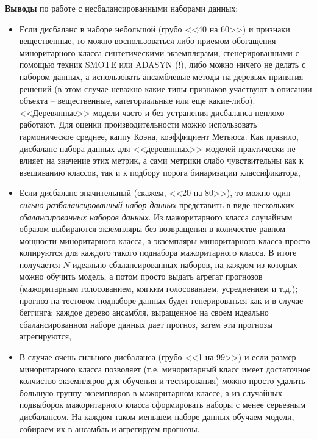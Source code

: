 \documentclass[%
	11pt,
	a4paper,
	utf8,
		]{article}
\begin{document}
\textbf{Выводы} по работе с несбалансированными наборами данных:
\begin{itemize}
	\item Если дисбаланс в наборе небольшой (грубо <<40 на 60>>) и признаки вещественные, то можно воспользоваться либо приемом обогащения миноритарного класса синтетическими экземплярами, сгенерированными с помощью техник SMOTE или ADASYN (!), либо можно ничего не делать с набором данных, а использовать ансамблевые методы на деревьях принятия решений (в этом случае неважно какие типы признаков участвуют в описании объекта -- вещественные, категориальные или еще какие-либо). <<Деревянные>> модели часто и без устранения дисбаланса неплохо работают. Для оценки производительности можно использовать гармоническое среднее, каппу Коэна, коэффициент Метьюса. Как правило, дисбаланс набора данных для <<деревянных>> моделей практически не влияет на значение этих метрик, а сами метрики слабо чувствительны как к взешиванию классов, так и к подбору порога бинаризации классификатора,
	
	\item Если дисбаланс значительный (скажем, <<20 на 80>>), то можно один \emph{сильно разбалансированный набор данных} представить в виде нескольких \emph{сбалансированных наборов данных}. Из мажоритарного класса случайным образом выбираются экземпляры без возвращения в количестве равном мощности миноритарного класса, а экземпляры миноритарного класса просто копируются для каждого такого поднабора мажоритарного класса. В итоге получается $ N $ идеально сбалансированных наборов, на каждом из которых можно обучить модель, а потом просто выдать агрегат прогнозов (мажоритарным голосованием, мягким голосованием, усреднением и т.д.); прогноз на тестовом поднаборе данных будет генерироваться как и в случае беггинга: каждое дерево ансамбля, выращенное на своем идеально сбалансированном наборе данных дает прогноз, затем эти прогнозы агрегируются,
	
	\item В случае очень сильного дисбаланса (грубо <<1 на 99>>) и если размер миноритарного класса позволяет (т.е. миноритарный класс имеет достаточное колчиство экземпляров для обучения и тестирования) можно просто удалить б\emph{о}льшую группу экземпляров в мажоритарном классе, а из случайных подвыборок мажоритарного класса сформировать наборы с менее серьезным дисбалансом. На каждом таком меньшем наборе данных обучаем модели, собираем их в ансамбль и агрегируем прогнозы.
\end{itemize}
\end{document}
